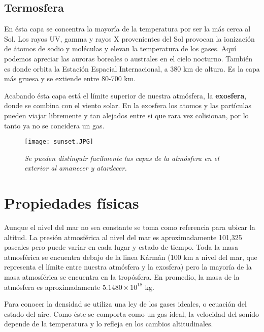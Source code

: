 \documentclass[12pt]{article}
\begin{document}
\subsection{Termosfera}

\noindent

En \'esta capa se concentra la mayor\'ia de la temperatura por ser la m\'as cerca al Sol. Los rayos UV, gamma y rayos X provenientes del Sol provocan la ionizaci\'on de \'atomos de sodio y mol\'eculas y elevan la temperatura de los gases. Aqu\'i podemos apreciar las auroras boreales o australes en el cielo nocturno. Tambi\'en es donde orbita la Estaci\'on Espacial Internacional, a 380 km de altura. Es la capa m\'as gruesa y se extiende entre 80-700 km. 

Acabando \'esta capa est\'a el l\'imite superior de nuestra atm\'osfera, la \textbf{exosfera}, donde se combina con el viento solar. En la exosfera los atomos y las part\'iculas pueden viajar libremente y tan alejados entre si que rara vez colisionan, por lo tanto ya no se concidera un gas. 

\begin{figure}[H]
\texttt{[image: sunset.JPG]}
\centering
\caption{\emph{\scriptsize{Se pueden distinguir facilmente las capas de la atm\'osfera en el exterior al amanecer y atardecer.}}}
\end{figure}

\section{Propiedades f\'isicas}
\noindent
Aunque el nivel del mar no sea constante se toma como referencia para ubicar la altitud. La presi\'on atmosf\'erica al nivel del mar es aproximadamente 101,325 pascales pero puede variar en cada lugar y estado de tiempo. Toda la masa atmosf\'erica se encuentra debajo de la linea K\'arm\'an (100 km a nivel del mar, que representa el l\'imite entre nuestra atm\'osfera y la exosfera) pero la mayor\'ia de la masa atmosf\'erica se encuentra en la trop\'osfera. En promedio, la masa de la atm\'osfera es aproximadamente $5.1480\times10^{18}$ kg.

Para conocer la densidad se utiliza una ley de los gases ideales, o ecuaci\'on del estado del aire. Como \'este se comporta como un gas ideal, la velocidad del sonido depende de la temperatura y lo refleja en los cambios altitudinales.
\end{document}
